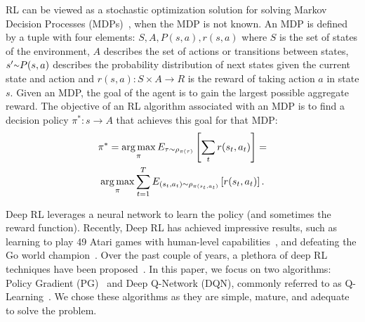 RL can be viewed as a stochastic optimization solution for solving Markov Decision Processes (MDPs)~\cite{bellman1957}, when the MDP is not known. An MDP 
is defined by a tuple with four elements:
${S,A,P(s,a),r(s,a)}$ where $S$ is the set of states of the environment, $A$ describes the set of actions or transitions between states, $s' {\raise.17ex\hbox{$\scriptstyle\mathtt{\sim}$}}
 P(s,a)$ describes the probability distribution of next states given the current state and action and $r(s,a):S \times A \rightarrow R$ is the reward of taking action $a$ in state $s$. Given an MDP, the goal of the agent is to gain the largest possible aggregate reward. The objective of an RL algorithm associated with an MDP is to find a decision policy $\pi^*:s\rightarrow A$ that achieves this goal for that MDP:
\begin{multline}
\label{eq:MDP}
    \pi^* = \argmaxA_\pi E_{\tau{\raise.05ex\hbox{$\scriptstyle\mathtt{\sim}$}}\rho_{\pi(\tau)}} \left[\sum_{t}^{}r(s_t,a_t) \right] = \\
    \argmaxA_\pi \sum_{t=1}^{T}E_{(s_t,a_t){\raise.05ex\hbox{$\scriptstyle\mathtt{\sim}$}}\rho_{\pi(s_t,a_t)}}\left[r(s_t,a_t)\right].
\end{multline}

Deep RL leverages a neural network to learn the policy (and sometimes the reward function). Recently, Deep RL has achieved impressive results, such as learning to play 49 Atari games with human-level capabilities~\cite{mnih2015}, and defeating the Go world champion~\cite{silver2016}. Over the past couple of years, a plethora of deep RL techniques have been proposed~\cite{mnih2016,ross2011,sutton2000,watkins1992q}. In this paper, we focus on two algorithms: Policy Gradient (PG)~\cite{sutton2000} and Deep Q-Network (DQN), commonly referred to as Q-Learning~\cite{watkins1992q}. We chose these algorithms as they are simple, mature, and adequate to solve the problem. 

